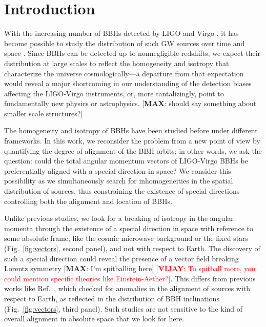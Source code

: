\documentclass[aps,prd,twocolumn,superscriptaddress,preprintnumbers,floatfix,nofootinbib]{revtex4-2}
\newcommand*{\mi}[1]{{\color{magenta} [{\bf MAX}: #1]}}
\newcommand*{\vv}[1]{\textcolor{red}{[\textbf{VIJAY}: #1]}}
\begin{document}
\section{Introduction}
\label{sec:intro}

With the increasing number of \acp{BBH} detected by LIGO \cite{TheLIGOScientific:2014jea} and Virgo \cite{TheVirgo:2014hva}, it has become possible to study the distribution of such \ac{GW} sources over time and space \cite{LIGOScientific:2021psn,Fishbach:2018edt,Fishbach:2021yvy,Stiskalek:2020wbj,Payne:2020pmc,Cavaglia:2020fnc,Essick:2022slj}.
Since \acp{BBH} can be detected up to nonnegligible redshifts, we expect their distribution at large scales to reflect the homogeneity and isotropy that characterize the universe cosmologically---a departure from that expectation would reveal a major shortcoming in our understanding of the detection biases affecting the LIGO-Virgo instruments, or, more tantalizingly, point to fundamentally new physics or astrophysics.
 \mi{should say something about smaller scale structures?}

The homogeneity \cite{Stiskalek:2020wbj,Payne:2020pmc,Cavaglia:2020fnc,Essick:2022slj} and isotropy \cite{Vitale:2022pmu} of \acp{BBH} have been studied before under different frameworks.
In this work, we reconsider the problem from a new point of view by quantifying the degree of alignment of the \ac{BBH} orbits; in other words, we ask the question: could the total angular momentum vectors of LIGO-Virgo \acp{BBH} be preferentially aligned with a special direction in space?
We consider this possibility as we simultaneously search for inhomogeneities in the spatial distribution of sources, thus constraining the existence of special directions controlling both the alignment and location of \acp{BBH}.

Unlike previous studies, we look for a breaking of isotropy in the angular momenta through the existence of a special direction in space with reference to some absolute frame, like the cosmic microwave background or the fixed stars (Fig.~\ref{fig:vectors}, second panel), and not with respect to Earth.
The discovery of such a special direction could reveal the presence of a vector field breaking Lorentz symmetry \mi{I'm spitballing here} \vv{To spitball more, you could mention specific theories like Einstein-Aether?}.
This differs from previous works like Ref.~\cite{Vitale:2022pmu}, which checked for anomalies in the alignment of sources with respect to Earth, as reflected in the distribution of \ac{BBH} inclinations (Fig.~\ref{fig:vectors}, third panel).
Such studies are not sensitive to the kind of overall alignment in absolute space that we look for here.
\end{document}
